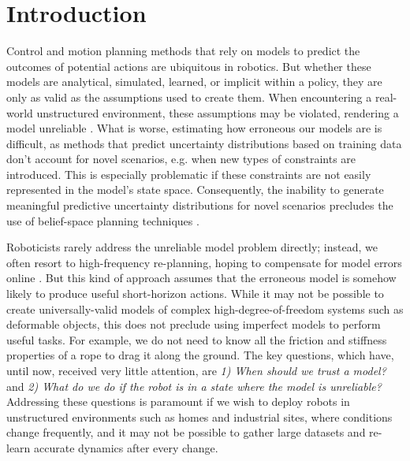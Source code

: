 \section{Introduction} \label{SciRob:sec:intro}

Control and motion planning methods that rely on models to predict the outcomes of potential actions are ubiquitous in robotics. But whether these models are analytical, simulated, learned, or implicit within a policy, they are only as valid as the assumptions used to create them. When encountering a real-world unstructured environment, these assumptions may be violated, rendering a model unreliable \cite{Wang2019}. What is worse, estimating how erroneous our models are is difficult, as methods that predict uncertainty distributions based on training data \cite{Chua2018,Lakshminarayanan2017} don’t account for novel scenarios, e.g. when new types of constraints are introduced. This is especially problematic if these constraints are not easily represented \cite{Kamthe2018} in the model’s state space. Consequently, the inability to generate meaningful predictive uncertainty distributions for novel scenarios precludes the use of belief-space planning techniques \cite{WangBounded2018,FIRM,LQGMP}.

Roboticists rarely address the unreliable model problem directly; instead, we often resort to high-frequency re-planning, hoping to compensate for model errors online \cite{Finn2017,Koller2019}. But this kind of approach assumes that the erroneous model is somehow likely to produce useful short-horizon actions. While it may not be possible to create universally-valid models of complex high-degree-of-freedom systems such as deformable objects, this does not preclude using imperfect models to perform useful tasks. For example, we do not need to know all the friction and stiffness properties of a rope to drag it along the ground. The key questions, which have, until now, received very little attention, are \textit{1) When should we trust a model?} and \textit{2) What do we do if the robot is in a state where the model is unreliable?} Addressing these questions is paramount if we wish to deploy robots in unstructured environments such as homes and industrial sites, where conditions change frequently, and it may not be possible to gather large datasets and re-learn accurate dynamics after every change. 

